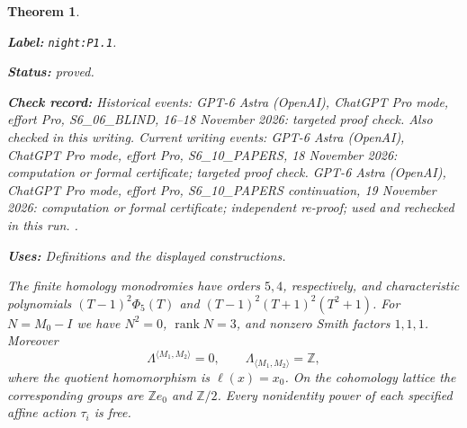 \documentclass[11pt,a4paper]{article}
\newtheorem{theorem}{Theorem}[section]
\theoremstyle{definition}
\newcommand{\StatementRecord}[4]{\par\smallskip\begingroup\upshape\raggedright\noindent\textbf{Label:} \nolinkurl{#1}.\par\noindent\textbf{Status:} #2.\par\noindent\textbf{Check record:} #3.\par\noindent\textbf{Uses:} #4.\par\endgroup\smallskip}
\begin{document}
\begin{theorem}\label{night:P1.1}
\StatementRecord{night:P1.1}{proved}{Historical events: GPT-6 Astra (OpenAI), ChatGPT Pro mode, effort Pro, S6\_06\_BLIND, 16--18 November 2026: targeted proof check. Also checked in this writing. Current writing events: GPT-6 Astra (OpenAI), ChatGPT Pro mode, effort Pro, S6\_10\_PAPERS, 18 November 2026: computation or formal certificate; targeted proof check. GPT-6 Astra (OpenAI), ChatGPT Pro mode, effort Pro, S6\_10\_PAPERS continuation, 19 November 2026: computation or formal certificate; independent re-proof; used and rechecked in this run. }{Definitions and the displayed constructions}
The finite homology monodromies have orders $5,4$, respectively, and
characteristic polynomials
$(T-1)^2\Phi _5(T)$ and $(T-1)^2(T+1)^2(T^2+1)$.
For $N=M_0-I$ we have $N^2=0$, $\operatorname{rank}N=3$, and
nonzero Smith factors $1,1,1$.  Moreover
\[
 \Lambda^{\langle M_1,M_2\rangle}=0,\qquad
 \Lambda_{\langle M_1,M_2\rangle}=\mathbb Z,
\]
where the quotient homomorphism is $\ell(x)=x_0$.
On the cohomology lattice the corresponding groups are $\mathbb Ze_0$
and $\mathbb Z/2$.  Every nonidentity power of each specified affine
action $\tau_i$ is free.
\end{theorem}
\end{document}
